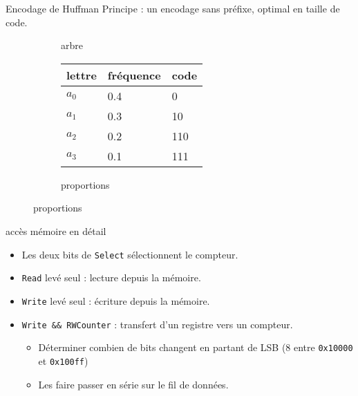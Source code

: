 \documentclass[slidetop,11pt,table]{beamer}
\begin{document}
\begin{frame}{Encodage de Huffman}
  Principe : un encodage sans préfixe, optimal en taille de code.
  \newcommand{\choice}{node[left]{\footnotesize 0} node[right]{\footnotesize 1}}
  \begin{figure}
    \begin{subfigure}{0.48\textwidth}
      \caption{arbre}
    \end{subfigure}
    \begin{subfigure}{0.48\textwidth}
      \begin{tabular}{|l|l|l|}
        \hline
        lettre & fréquence & code \\
        \hline
        $a_0$ & 0.4 & 0 \\
        $a_1$ & 0.3 & 10 \\
        $a_2$ & 0.2 & 110 \\
        $a_3$ & 0.1 & 111 \\
        \hline
      \end{tabular}
      \caption{proportions}
    \end{subfigure}

  \end{figure}
\end{frame}

\begin{frame}{accès mémoire en détail}
  \begin{center}
    \scalebox{0.4}{\proco}
  \end{center}
  \begin{itemize}
  \item Les deux bits de \texttt{Select} sélectionnent le compteur.
  \item \texttt{Read} levé seul : lecture depuis la mémoire.
  \item \texttt{Write} levé seul : écriture depuis la mémoire.
  \item \texttt{Write \&\& RWCounter} : transfert d'un registre vers un compteur.
    \begin{itemize}
    \item Déterminer combien de bits changent en partant de LSB (8 entre \texttt{0x10000} et \texttt{0x100ff})
    \item Les faire passer en série sur le fil de données.
    \end{itemize}
  \end{itemize}
\end{frame}
\end{document}
